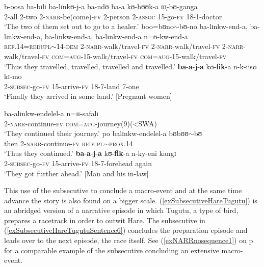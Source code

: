 \begin{exe}
\ex \label{exSubsecutiveJaKufikaRepetitionEnda}
\begin{xlist}
\ex\gll b-oosa ba-bɪlɪ ba-lɪnkʊ-j-a ba-ndʊ ba-a kʊ-bʊʊk-a m̩-bʊ-ganga\\
2-all 2-two 2-\textsc{narr}-be(come)-\textsc{fv} 2-person 2-\textsc{assoc} 15-go-\textsc{fv} 18-1-doctor\\
\glt `The two of them set out to go to a healer.'
\ex\gll boo=bʊno$\sim$bʊ-no ba-lɪnkw-end-a, ba-lɪnkw-end-a, ba-lɪnkw-end-a, ba-lɪnkw-end-a n=ʊ-kw-end-a\\
\textsc{ref.14}=\textsc{redupl}$\sim$14-\textsc{dem} 2-\textsc{narr}-walk/travel-\textsc{fv} 2-\textsc{narr}-walk/travel-\textsc{fv} 2-\textsc{narr}-walk/travel-\textsc{fv} \textsc{com}=\textsc{aug}-15-walk/travel-\textsc{fv} \textsc{com}=\textsc{aug}-15-walk/travel-\textsc{fv}\\
\glt `Thus they travelled, travelled, travelled and travelled.'
\ex\gll \textbf{ba}-\textbf{a}-\textbf{j}-\textbf{a} kʊ-\textbf{fik}-a n-k-iisʊ kɪ-mo\\
2-\textsc{subsec}-go-\textsc{fv} 15-arrive-\textsc{fv} 18-7-land 7-one\\
\glt `Finally they arrived in some land.' [Pregnant women]
\end{xlist}
\ex \label{exSubsecutiveJaKufikaEndelela}
\begin{xlist}
\ex \gll ba-alɪnkw-endelel-a n=ɪɪ-safalɪ\\
2-\textsc{narr}-continue-\textsc{fv} \textsc{com}=\textsc{aug}-journey(9)(<SWA)\\
\glt \lq They continued their journey.'
\ex \gll po balɪnkw-endelel-a bʊbʊʊ$\sim$bʊ\\
then 2-\textsc{narr}-continue-\textsc{fv} \textsc{redupl}$\sim$\textsc{prox.14}\\
\glt \lq Thus they continued.'
\ex\gll \textbf{ba}-\textbf{a}-\textbf{j}-\textbf{a} kʊ-\textbf{fik}-a n-ky-eni kangɪ\\
 2-\textsc{subsec}-go-\textsc{fv} 15-arrive-\textsc{fv} 18-7-forehead again\\
\glt `They got further ahead.' [Man and his in-law]
\end{xlist}
\end{exe}

This use of the subsecutive to conclude a macro-event and at the same time advance the story is also found on a bigger scale. (\ref{exSubsecutiveHareTugutu}) is an abridged version of a narrative episode in which Tugutu, a type of bird, prepares a racetrack in order to outwit Hare. The subsecutive in (\ref{exSubsecutiveHareTugutuSentence6}) concludes the preparation episode and leads over to the next episode, the race itself. See (\ref{exNARRnosequence1}) on p.\nobreakspace\pageref{exNARRnosequence1sentence5} for a comparable example of the subsecutive concluding an extensive macro-event. 

